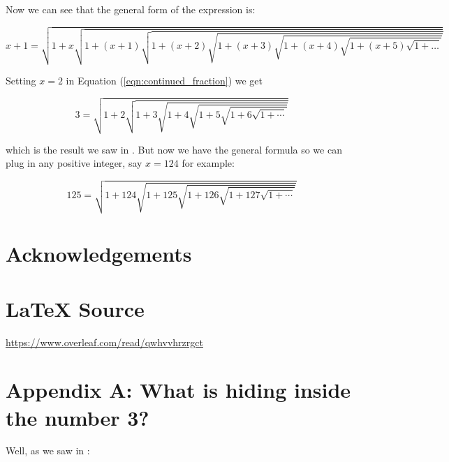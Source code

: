\documentclass{article}
\theoremstyle{definition}
\begin{document}
\bigskip
\noindent
Now we can see that the general form of the expression is:

\bigskip
\begin{equation}
x+1 = \sqrt{1+x\sqrt{1+(x+1)\sqrt{1+(x+2)\sqrt{1+(x+3)\sqrt{1+(x+4)\sqrt{1 + (x+5)\sqrt{1+\hdots}}}}}}}
\label{eqn:continued_fraction}
\end{equation}

\bigskip
\noindent
Setting $x = 2$ in Equation (\ref{eqn:continued_fraction}) we get

\bigskip
\begin{equation*}
3 = \sqrt{1 + 2 \sqrt{1 + 3 \sqrt{1 + 4  \sqrt{1 + 5 \sqrt{1 + 6 \sqrt{1 + \cdots}}}}}}
\end{equation*}

\bigskip
\noindent
which is the result we saw in \cite{notes:what_is_hiding_inside_the_number_3}.
But now we have the general formula so we can plug in any positive integer, 
say $x = 124$ for example:

\bigskip
\begin{equation*}
125 = \sqrt{1 + 124 \sqrt{1 + 125 \sqrt{1 + 126  \sqrt{1 + 127 \sqrt{1 + \cdots}}}}}
\end{equation*}
%
%
%
\section*{Acknowledgements}
%
%
\section*{\LaTeX \hspace{0.10 mm} Source}
\url{https://www.overleaf.com/read/qwhvvhrzrgct}
%
%
%



\section*{Appendix A: What is hiding inside the number 3?}
\noindent
 Well, as we saw in \cite{notes:what_is_hiding_inside_the_number_3}:
\end{document}
